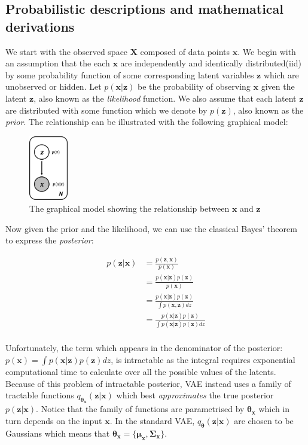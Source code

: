         \subsection{Probabilistic descriptions and mathematical derivations}
            We start with the observed space $\bm{X}$ composed of data points $\bm{x}$. We begin with an assumption that the each $\bm{x}$ are independently and identically distributed(iid) by some probability function of some corresponding latent variables $\bm{z}$ which are unobserved or hidden. Let $p(\bm{x}|\bm{z})$ be the probability of observing $\bm{x}$ given the latent $\bm{z}$, also known as the \textit{likelihood} function. We also assume that each latent $\bm{z}$ are distributed with some function which we denote by $p(\bm{z})$, also known as the \textit{prior}. The relationship can be illustrated with the following graphical model:
            
            \begin{figure}[H]
                \centering
                \includegraphics[width=0.15\textwidth]{imgs/x_z_graph.png}
                \caption{The graphical model showing the relationship between $\bm{x}$ and $\bm{z}$}
                \label{fig:x_z_graph}
            \end{figure}
            
            Now given the prior and the likelihood, we can use the classical Bayes' theorem to express the \textit{posterior}:
            
            \begin{align*} 
                p(\bm{z}|\bm{x}) &= \frac{p(\bm{z},\bm{x})}{p(\bm{x})}\\
                &= \frac{p(\bm{x} | \bm{z})p(\bm{z})}{p(\bm{x})}\\
                &= \frac{p(\bm{x} | \bm{z})p(\bm{z})}{\int p(\bm{x}, \bm{z}) dz}\\
                &= \frac{p(\bm{x} | \bm{z})p(\bm{z})}{\int p(\bm{x} | \bm{z}) p(\bm{z}) dz}\\
            \end{align*}

            Unfortunately, the term which appears in the denominator of the posterior: $p(\bm{x}) = \int p(\bm{x} | \bm{z}) p(\bm{z}) dz$, is intractable as the integral requires exponential computational time to calculate over all the possible values of the latents. Because of this problem of intractable posterior, VAE instead uses a family of tractable functions $q_{\bm{\theta_x}}(\bm{z}|\bm{x})$ which best \textit{approximates} the true posterior $p(\bm{z}|\bm{x})$. Notice that the family of functions are parametrised by $\bm{\theta_x}$ which in turn depends on the input $\bm{x}$. In the standard VAE, $q_{\bm{\theta}}(\bm{z}|\bm{x})$ are chosen to be Gaussians which means that $\bm{\theta_x}= \{\bm{\mu_x}, \bm{\Sigma_x}\}$.
            
